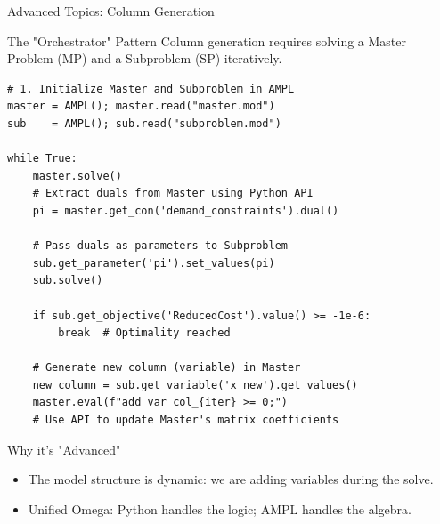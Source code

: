 \documentclass[presentation, aspectratio=169]{beamer}
\begin{document}
\begin{frame}[label={sec:orgb065aea},fragile]{Advanced Topics: Column Generation}
\begin{block}{The "Orchestrator" Pattern}
Column generation requires solving a \alert{\alert{Master Problem}} (MP) and a \alert{\alert{Subproblem}} (SP) iteratively.

\scriptsize
\begin{verbatim}
# 1. Initialize Master and Subproblem in AMPL
master = AMPL(); master.read("master.mod")
sub    = AMPL(); sub.read("subproblem.mod")

while True:
    master.solve()
    # Extract duals from Master using Python API
    pi = master.get_con('demand_constraints').dual()
    
    # Pass duals as parameters to Subproblem
    sub.get_parameter('pi').set_values(pi)
    sub.solve()
    
    if sub.get_objective('ReducedCost').value() >= -1e-6:
        break  # Optimality reached
        
    # Generate new column (variable) in Master
    new_column = sub.get_variable('x_new').get_values()
    master.eval(f"add var col_{iter} >= 0;") 
    # Use API to update Master's matrix coefficients
\end{verbatim}
\end{block}

\begin{block}{Why it's "Advanced"}
\begin{itemize}
\item The model structure is \alert{\alert{dynamic}}: we are adding variables \alert{during} the solve.
\item \alert{\alert{Unified Omega}}: Python handles the logic; AMPL handles the algebra.
\end{itemize}
\end{block}
\end{frame}
\end{document}
